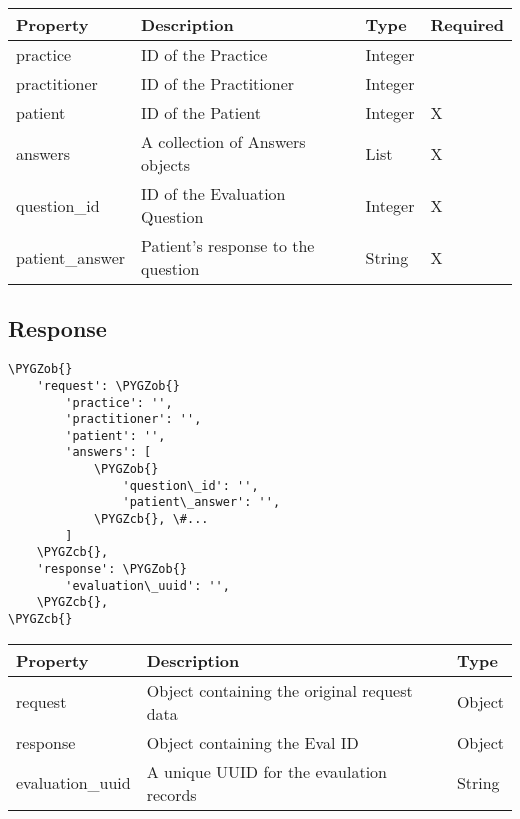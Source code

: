 \documentclass[letterpaper,10pt,english]{sphinxmanual}
\def\PYGZob{\char`\{}
\def\PYGZcb{\char`\}}
\begin{document}
\begin{tabulary}{\linewidth}{|L|L|L|L|}
\hline
\textsf{\relax 
Property
} & \textsf{\relax 
Description
} & \textsf{\relax 
Type
} & \textsf{\relax 
Required
}\\
\hline
practice
 & 
ID of the Practice
 & 
Integer
 & \\

practitioner
 & 
ID of the Practitioner
 & 
Integer
 & \\

patient
 & 
ID of the Patient
 & 
Integer
 & 
X
\\

answers
 & 
A collection of Answers objects
 & 
List
 & 
X
\\

question\_id
 & 
ID of the Evaluation Question
 & 
Integer
 & 
X
\\

patient\_answer
 & 
Patient's response to the question
 & 
String
 & 
X
\\
\hline\end{tabulary}



\subsection{Response}
\label{dev-api-evaluations:response}
\begin{Verbatim}[commandchars=\\\{\}]
\PYGZob{}
    'request': \PYGZob{}
        'practice': '',
        'practitioner': '',
        'patient': '',
        'answers': [
            \PYGZob{}
                'question\_id': '',
                'patient\_answer': '',
            \PYGZcb{}, \#...
        ]
    \PYGZcb{},
    'response': \PYGZob{}
        'evaluation\_uuid': '',
    \PYGZcb{},
\PYGZcb{}
\end{Verbatim}

\begin{tabulary}{\linewidth}{|L|L|L|}
\hline
\textsf{\relax 
Property
} & \textsf{\relax 
Description
} & \textsf{\relax 
Type
}\\
\hline
request
 & 
Object containing the original
request data
 & 
Object
\\

response
 & 
Object containing the Eval ID
 & 
Object
\\

evaluation\_uuid
 & 
A unique UUID for the evaulation
records
 & 
String
\\
\hline\end{tabulary}
\end{document}

